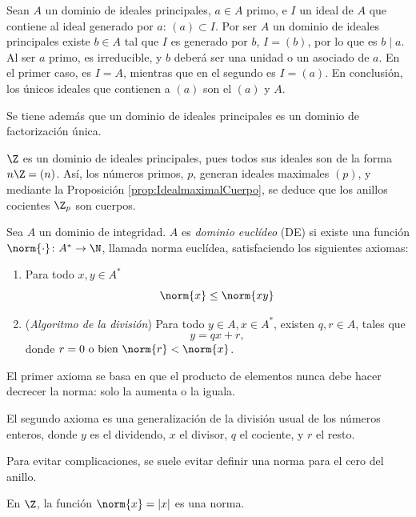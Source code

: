 \begin{prop}\end{prop}

\begin{dem}{\cite[p.~39]{GamboaAnillos}}
    Sean $A$ un dominio de ideales principales, $a\in A$ primo, e $I$ un ideal de $A$ que contiene al ideal generado por $a$: $(a) \subset I$. Por ser $A$ un dominio de ideales principales existe $b\in A$ tal que $I$ es generado por $b$, $I = (b)$, por lo que es $b\mid a$. Al ser $a$ primo, es irreducible, y $b$ deberá ser una unidad o un asociado de $a$. En el primer caso, es $I = A$, mientras que en el segundo es $I = (a)$. En conclusión, los únicos ideales que contienen a $(a)$ son el $(a)$ y $A$.
\end{dem}

Se tiene además que un dominio de ideales principales es un dominio de factorización única. \cite[p.~40]{Rosenberger}


    \begin{ejs}
        \item $\Z$ es un dominio de ideales principales, pues todos sus ideales son de la forma $n\Z = (n)$. Así, los números primos, $p$, generan ideales maximales $(p)$, y mediante la Proposición \ref{prop:IdealmaximalCuerpo}, se deduce que los anillos cocientes $\Z_p$ son cuerpos.
    \end{ejs}




\begin{deff}{\cite[p.~43]{Rosenberger}}
    Sea $A$ un dominio de integridad. $A$ es \textit{dominio euclídeo} (DE) si existe una función $\norm{\cdot} \colon A^* \to \N$, llamada norma euclídea, satisfaciendo los siguientes axiomas:
    \begin{enumerate}
        \item Para todo $x,y\in A^*$ \[\norm{x} \leq\norm{xy}\]
        \item (\textit{Algoritmo de la división}) Para todo $y\in A, x \in A^*$, existen $q,r \in A$, tales que \[y =qx + r,\] donde $r = 0 \text{ o bien } \norm{r} < \norm{x}$.
    \end{enumerate}
\end{deff}

\begin{obss}
        \item El primer axioma se basa en que el producto de elementos nunca debe hacer decrecer la norma: solo la aumenta o la iguala.
        \item El segundo axioma es una generalización de la división usual de los números enteros, donde $y$ es el dividendo, $x$ el divisor, $q$ el cociente, y $r$ el resto.
        \item Para evitar complicaciones, se suele evitar definir una norma para el cero del anillo.
        \item En $\Z$, la función $\norm{x} = |x|$ es una norma.
\end{obss}


